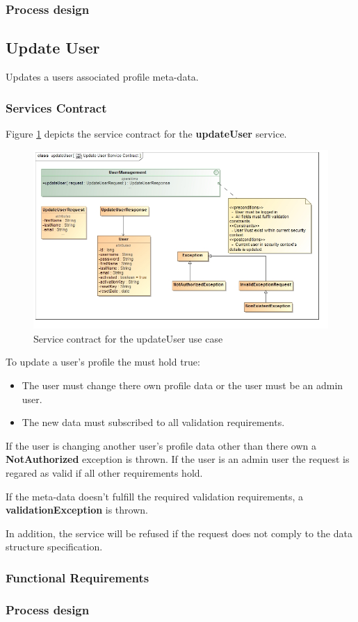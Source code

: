\subsubsection{Process design}

\subsection{Update User}
Updates a users associated profile meta-data.

\subsubsection{Services Contract}
Figure \ref{fig:updateUserServicesContract} depicts the service contract for the \textbf{updateUser} service.

\begin{figure}[H]
  \begin{center}
  \includegraphics[scale=0.55]{../Diagrams and Charts/Users/Update User Service Contract.jpg}
  \caption{Service contract for the updateUser use case}
  \label{fig:updateUserServicesContract}
  \end{center}
\end{figure}

To update a user's profile the must hold true:
\begin{itemize}
	\item The user must change there own profile data or the user must be an admin user.
	\item The new data must subscribed to all validation requirements.
\end{itemize}

If the user is changing another user's profile data other than there own a \textbf{NotAuthorized} exception is thrown.  If the user is an admin user the request is regared as valid if all other requirements hold.

If the meta-data doesn't fulfill the required validation requirements, a \textbf{validationException} is thrown.

In addition, the service will be refused if the request does not comply to the data structure specification.

\subsubsection{Functional Requirements}

\subsubsection{Process design}